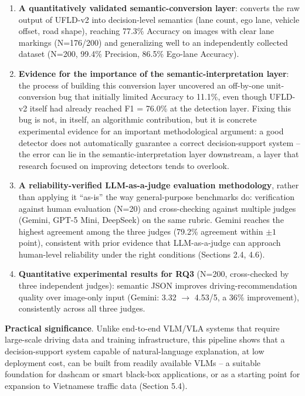 \documentclass[12pt,a4paper]{report}
\begin{document}
\begin{enumerate}
    \item \textbf{A quantitatively validated semantic-conversion layer}: converts the raw output of UFLD-v2 into decision-level semantics (lane count, ego lane, vehicle offset, road shape), reaching 77.3\% Accuracy on images with clear lane markings (N=176/200) and generalizing well to an independently collected dataset (N=200, 99.4\% Precision, 86.5\% Ego-lane Accuracy).
    \item \textbf{Evidence for the importance of the semantic-interpretation layer}: the process of building this conversion layer uncovered an off-by-one unit-conversion bug that initially limited Accuracy to 11.1\%, even though UFLD-v2 itself had already reached F1 = 76.0\% at the detection layer. Fixing this bug is not, in itself, an algorithmic contribution, but it is concrete experimental evidence for an important methodological argument: a good detector does not automatically guarantee a correct decision-support system -- the error can lie in the semantic-interpretation layer downstream, a layer that research focused on improving detectors tends to overlook.
    \item \textbf{A reliability-verified LLM-as-a-judge evaluation methodology}, rather than applying it ``as-is'' the way general-purpose benchmarks do: verification against human evaluation (N=20) and cross-checking against multiple judges (Gemini, GPT-5 Mini, DeepSeek) on the same rubric. Gemini reaches the highest agreement among the three judges (79.2\% agreement within $\pm 1$ point), consistent with prior evidence that LLM-as-a-judge can approach human-level reliability under the right conditions \cite{zheng2023mtbench} (Sections 2.4, 4.6).
    \item \textbf{Quantitative experimental results for RQ3} (N=200, cross-checked by three independent judges): semantic JSON improves driving-recommendation quality over image-only input (Gemini: 3.32 $\rightarrow$ 4.53/5, a 36\% improvement), consistently across all three judges.
\end{enumerate}

\textbf{Practical significance}. Unlike end-to-end VLM/VLA systems that require large-scale driving data and training infrastructure, this pipeline shows that a decision-support system capable of natural-language explanation, at low deployment cost, can be built from readily available VLMs -- a suitable foundation for dashcam or smart black-box applications, or as a starting point for expansion to Vietnamese traffic data (Section 5.4).
\end{document}

